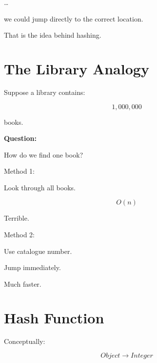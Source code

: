 \documentclass[11pt,a4paper]{book}
\begin{document}
\ldots


we could jump directly
to the correct location.


That is the idea behind hashing.


\section{The Library Analogy}

Suppose a library contains:

\[
1,000,000
\]

books.


\textbf{Question:}

How do we find one book?


Method 1:

Look through all books.


\[
O(n)
\]


Terrible.


Method 2:

Use catalogue number.


Jump immediately.


Much faster.


\section{Hash Function}

Conceptually:

\[
Object
\rightarrow
Integer
\]
\end{document}
